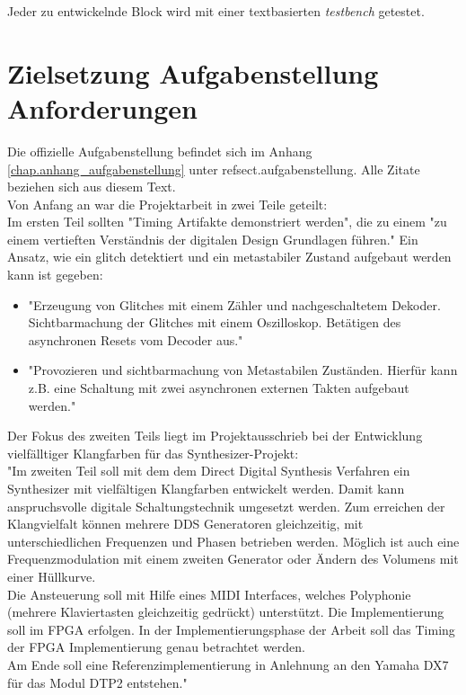 Jeder zu entwickelnde Block wird mit einer textbasierten \textit{testbench} getestet. 

\section{Zielsetzung Aufgabenstellung Anforderungen}\label{sect.einleitung_ziele}
Die offizielle Aufgabenstellung befindet sich im Anhang \ref{chap.anhang_aufgabenstellung} unter ref{sect.aufgabenstellung}. Alle Zitate beziehen sich aus diesem Text.\\

Von Anfang an war die Projektarbeit in zwei Teile geteilt:\\Im ersten Teil sollten "Timing Artifakte demonstriert werden", die zu einem "zu einem vertieften Verständnis der digitalen Design Grundlagen führen." 
Ein Ansatz, wie ein glitch detektiert und ein metastabiler Zustand aufgebaut werden kann ist gegeben:\\
\begin{itemize}
	\item "Erzeugung von Glitches mit einem Zähler und nachgeschaltetem Dekoder. Sichtbarmachung der Glitches mit einem Oszilloskop. Betätigen des asynchronen Resets vom Decoder aus." 

	\item "Provozieren und sichtbarmachung von Metastabilen Zuständen. Hierfür kann z.B. eine Schaltung mit zwei asynchronen externen Takten aufgebaut werden." 
\end{itemize}  

Der Fokus des zweiten Teils liegt im Projektausschrieb bei der Entwicklung vielfälltiger Klangfarben für das Synthesizer-Projekt: \\
"Im zweiten Teil soll mit dem dem Direct Digital Synthesis Verfahren ein Synthesizer mit vielfältigen Klangfarben entwickelt werden. Damit kann anspruchsvolle digitale Schaltungstechnik umgesetzt werden. Zum erreichen der Klangvielfalt können mehrere DDS Generatoren gleichzeitig, mit unterschiedlichen Frequenzen und Phasen betrieben werden. Möglich ist auch eine Frequenzmodulation mit einem zweiten Generator oder Ändern des Volumens mit einer Hüllkurve. \\
Die Ansteuerung soll mit Hilfe eines MIDI Interfaces, welches Polyphonie (mehrere Klaviertasten gleichzeitig gedrückt) unterstützt. Die Implementierung soll im FPGA erfolgen. In der Implementierungsphase der Arbeit soll das Timing der FPGA Implementierung genau betrachtet werden. \\
Am Ende soll eine Referenzimplementierung in Anlehnung an den Yamaha DX7 für das Modul DTP2 entstehen."

